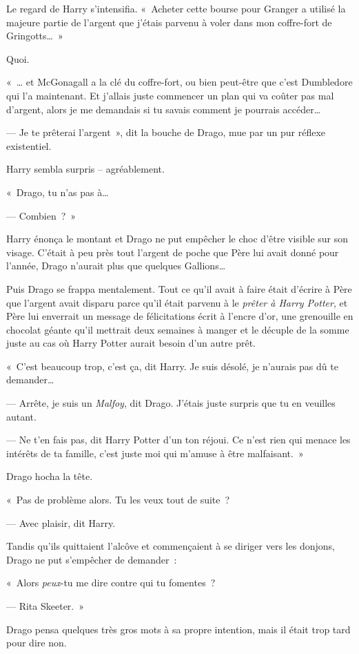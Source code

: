 Le regard de Harry s'intensifia. «~Acheter cette bourse pour Granger a utilisé la majeure partie de l'argent que j'étais parvenu à voler dans mon coffre-fort de Gringotts…~»

Quoi.

«~… et McGonagall a la clé du coffre-fort, ou bien peut-être que c'est Dumbledore qui l'a maintenant. Et j'allais juste commencer un plan qui va coûter pas mal d'argent, alors je me demandais si tu savais comment je pourrais accéder…

--- Je te prêterai l'argent~», dit la bouche de Drago, mue par un pur réflexe existentiel.

Harry sembla surpris -- agréablement.

«~Drago, tu n'as pas à…

--- Combien~?~»

Harry énonça le montant et Drago ne put empêcher le choc d'être visible sur son visage. C'était à peu près tout l'argent de poche que Père lui avait donné pour l'année, Drago n'aurait plus que quelques Gallions…

Puis Drago se frappa mentalement. Tout ce qu'il avait à faire était d'écrire à Père que l'argent avait disparu parce qu'il était parvenu à le \emph{prêter à Harry Potter}, et Père lui enverrait un message de félicitations écrit à l'encre d'or, une grenouille en chocolat géante qu'il mettrait deux semaines à manger et le décuple de la somme juste au cas où Harry Potter aurait besoin d'un autre prêt.

«~C'est beaucoup trop, c'est ça, dit Harry. Je suis désolé, je n'aurais pas dû te demander…

--- Arrête, je suis un \emph{Malfoy}, dit Drago. J'étais juste surpris que tu en veuilles autant.

--- Ne t'en fais pas, dit Harry Potter d'un ton réjoui. Ce n'est rien qui menace les intérêts de ta famille, c'est juste moi qui m'amuse à être malfaisant.~»

Drago hocha la tête.

«~Pas de problème alors. Tu les veux tout de suite~?

--- Avec plaisir, dit Harry.

Tandis qu'ils quittaient l'alcôve et commençaient à se diriger vers les donjons, Drago ne put s'empêcher de demander~:

«~Alors \emph{peux}-tu me dire contre qui tu fomentes~?

--- Rita Skeeter.~»

Drago pensa quelques très gros mots à sa propre intention, mais il était trop tard pour dire non.

